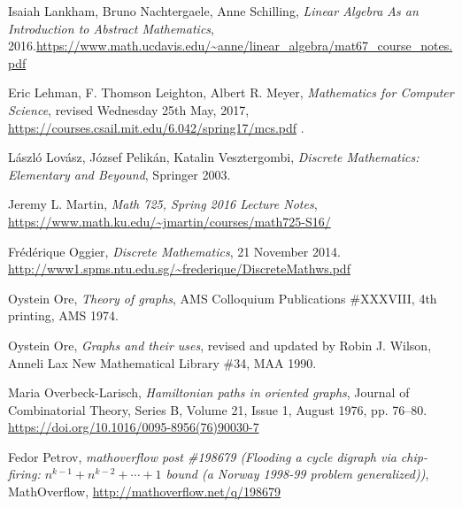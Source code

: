 \documentclass[numbers=enddot,12pt,final,onecolumn,notitlepage]{scrartcl}%
\theoremstyle{definition}
\begin{document}
\begin{thebibliography}{9999999999}
Isaiah Lankham, Bruno Nachtergaele, Anne
Schilling, \textit{Linear Algebra As an Introduction to Abstract Mathematics},
2016.\newline\url{https://www.math.ucdavis.edu/~anne/linear_algebra/mat67_course_notes.pdf}

Eric Lehman, F. Thomson Leighton, Albert R. Meyer,
\textit{Mathematics for Computer Science},
revised  Wednesday 25th May, 2017,
\newline\url{https://courses.csail.mit.edu/6.042/spring17/mcs.pdf} .

L\'aszl\'o Lov\'asz, J\'ozsef Pelik\'an,
Katalin Vesztergombi,
\textit{Discrete Mathematics: Elementary and Beyound},
Springer 2003.

Jeremy L. Martin,
\textit{Math 725, Spring 2016 Lecture Notes},
\newline\url{https://www.math.ku.edu/~jmartin/courses/math725-S16/}


Fr\'ed\'erique Oggier,
\textit{Discrete Mathematics},
21 November 2014.
\newline\url{http://www1.spms.ntu.edu.sg/~frederique/DiscreteMathws.pdf}

Oystein Ore, \textit{Theory of graphs},
AMS Colloquium Publications \#XXXVIII,
4th printing, AMS 1974.

Oystein Ore, \textit{Graphs and their uses}, revised and updated by
Robin J. Wilson,
Anneli Lax New Mathematical Library \#34, MAA 1990.

Maria Overbeck-Larisch,
\textit{Hamiltonian paths in oriented graphs},
Journal of Combinatorial Theory, Series B,
Volume 21, Issue 1, August 1976, pp. 76--80.
\newline \url{https://doi.org/10.1016/0095-8956(76)90030-7}

Fedor Petrov,
\textit{mathoverflow post \#198679 (Flooding a cycle digraph via
chip-firing: $n^{k-1} + n^{k-2} + \cdots + 1$ bound (a Norway 1998-99
problem generalized))},
MathOverflow,
\newline \url{http://mathoverflow.net/q/198679}


\end{thebibliography}
\end{document}
